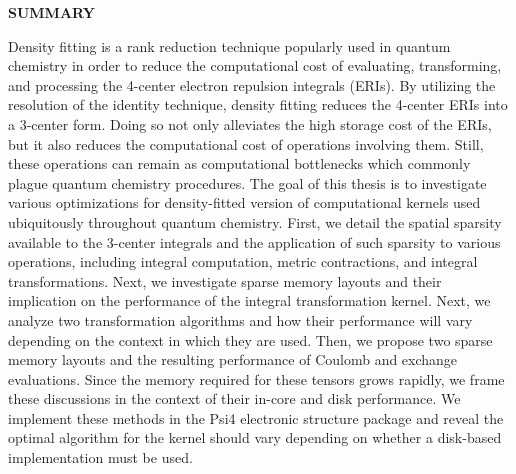 \clearpage
\begin{centering}
\textbf{SUMMARY}\\
\vspace{\baselineskip}
\end{centering}

Density fitting is a rank reduction technique popularly used in quantum chemistry in order to reduce the computational cost 
of evaluating, transforming, and processing the 4-center electron repulsion integrals (ERIs). By utilizing the resolution of the 
identity technique, density fitting reduces the 4-center ERIs into a 3-center form. Doing so not only alleviates the high storage cost
of the ERIs, but it also reduces the computational cost of operations involving them. Still, these operations can remain as computational
bottlenecks which commonly plague quantum chemistry procedures. The goal of this thesis is to investigate various optimizations for 
density-fitted version of computational kernels used ubiquitously throughout quantum chemistry. 
First, we detail the spatial sparsity available to the
3-center integrals and the application of such sparsity to various operations, including integral computation, metric 
contractions, and integral transformations. Next, we investigate sparse memory layouts and their implication 
on the performance of the integral transformation kernel. Next, we analyze two transformation algorithms and how 
their performance will vary depending on the context in which they are used. Then, we propose two sparse memory 
layouts and the resulting performance of Coulomb and exchange evaluations. Since the memory required for these 
tensors grows rapidly, we frame these discussions in the context of their in-core and disk performance. 
We implement these methods in the {\sc Psi4} electronic structure package and reveal the optimal algorithm for the  
kernel should vary depending on whether a disk-based implementation must be used.

